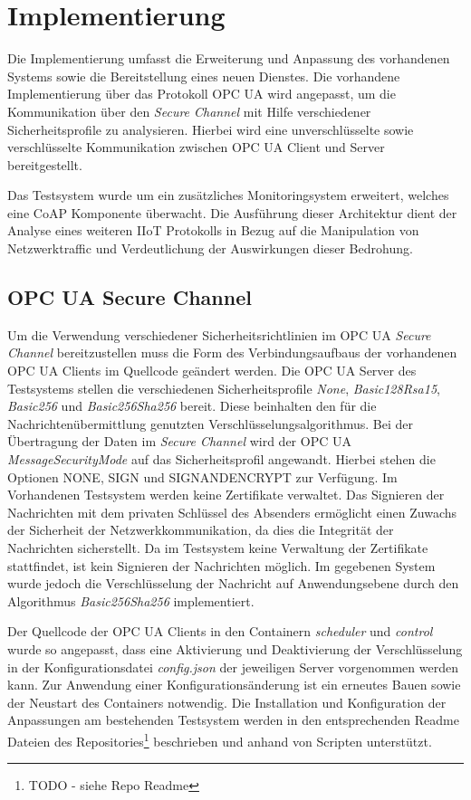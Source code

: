 \section{Implementierung}
Die Implementierung umfasst die Erweiterung und Anpassung des vorhandenen Systems sowie die Bereitstellung eines neuen Dienstes. Die vorhandene Implementierung über das Protokoll \ac{OPC UA} wird angepasst, um die Kommunikation über den \textit{Secure Channel} mit Hilfe verschiedener Sicherheitsprofile zu analysieren. Hierbei wird eine unverschlüsselte sowie verschlüsselte Kommunikation zwischen \ac{OPC UA} Client und Server bereitgestellt.

Das Testsystem wurde um ein zusätzliches Monitoringsystem erweitert, welches eine \ac{CoAP} Komponente überwacht. Die Ausführung dieser Architektur dient der Analyse eines weiteren \ac{IIoT} Protokolls in Bezug auf die Manipulation von Netzwerktraffic und Verdeutlichung der Auswirkungen dieser Bedrohung.

\subsection{\ac{OPC UA} Secure Channel}
\label{Impl:OPC UA Secure Channel}
Um die Verwendung verschiedener Sicherheitsrichtlinien im \ac{OPC UA} \textit{Secure Channel} bereitzustellen muss die Form des Verbindungsaufbaus der vorhandenen \ac{OPC UA} Clients im Quellcode geändert werden. Die \ac{OPC UA} Server des Testsystems stellen die verschiedenen Sicherheitsprofile \textit{None}, \textit{Basic128Rsa15}, \textit{Basic256} und \textit{Basic256Sha256} bereit. Diese beinhalten den für die Nachrichtenübermittlung genutzten Verschlüsselungsalgorithmus. Bei der Übertragung der Daten im \textit{Secure Channel} wird der \ac{OPC UA} \textit{MessageSecurityMode} auf das Sicherheitsprofil angewandt. Hierbei stehen die Optionen NONE, SIGN und SIGNANDENCRYPT zur Verfügung. Im Vorhandenen Testsystem werden keine Zertifikate verwaltet. Das Signieren der Nachrichten mit dem privaten Schlüssel des Absenders ermöglicht einen Zuwachs der Sicherheit der Netzwerkkommunikation, da dies die Integrität der Nachrichten sicherstellt. Da im Testsystem keine Verwaltung der Zertifikate stattfindet, ist kein Signieren der Nachrichten möglich. Im gegebenen System wurde jedoch die Verschlüsselung der Nachricht auf Anwendungsebene durch den Algorithmus \textit{Basic256Sha256} implementiert.

Der Quellcode der \ac{OPC UA} Clients in den Containern \textit{scheduler} und \textit{control} wurde so angepasst, dass eine Aktivierung und Deaktivierung der Verschlüsselung in der Konfigurationsdatei \textit{config.json} der jeweiligen Server vorgenommen werden kann. Zur Anwendung einer Konfigurationsänderung ist ein erneutes Bauen sowie der Neustart des Containers notwendig. Die Installation und Konfiguration der Anpassungen am bestehenden Testsystem werden in den entsprechenden Readme Dateien des Repositories\footnote{TODO - siehe Repo Readme} beschrieben und anhand von Scripten unterstützt.

